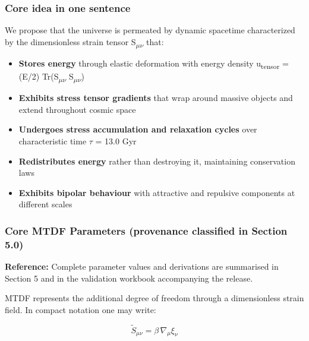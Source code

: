 \documentclass[11pt,a4paper]{article}
\begin{document}
\begin{mdframed}[linecolor=accent,linewidth=0.5pt,backgroundcolor=callout-bg,leftline=true,rightline=true,topline=true,bottomline=true,innerleftmargin=8pt,innerrightmargin=8pt,innertopmargin=6pt,innerbottommargin=6pt]
\subsubsection{Core idea in one sentence}
We propose that the universe is permeated by dynamic spacetime characterized by the dimensionless strain tensor S\textsubscript{$\mu$$\nu$} that:

\begin{itemize}
  \item \textbf{Stores energy} through elastic deformation with energy density u\textsubscript{tensor} = (E/\allowbreak{}2) Tr(S\textsubscript{$\mu$$\nu$} S\textsubscript{$\mu$$\nu$})
  \item \textbf{Exhibits stress tensor gradients} that wrap around massive objects and extend throughout cosmic space
  \item \textbf{Undergoes stress accumulation and relaxation cycles} over characteristic time $\tau$ = 13.0 Gyr
  \item \textbf{Redistributes energy} rather than destroying it, maintaining conservation laws
  \item \textbf{Exhibits bipolar behaviour} with attractive and repulsive components at different scales
\end{itemize}

\begin{mdframed}[linecolor=accent,linewidth=0.5pt,backgroundcolor=callout-bg,leftline=true,rightline=true,topline=true,bottomline=true,innerleftmargin=8pt,innerrightmargin=8pt,innertopmargin=6pt,innerbottommargin=6pt]
\subsubsection{Core MTDF Parameters (provenance classified in Section 5.0)}
\textbf{Reference:} Complete parameter values and derivations are summarised in Section 5 and in the validation workbook accompanying the release.
\end{mdframed}
\end{mdframed}

MTDF represents the additional degree of freedom through a dimensionless strain field. In compact notation one may write:

\[
\tilde{S}_{\mu\nu} = \beta\,\nabla_\mu \xi_\nu
\]
\end{document}
